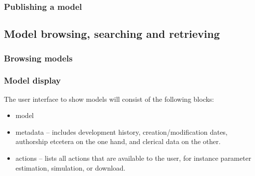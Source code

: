 \subsubsection{Publishing a model}



\subsection{Model browsing, searching and retrieving}

\subsubsection{Browsing models}

\subsubsection{Model display}

The user interface to show models will consist of the following blocks:
\begin{itemize}
\item model
\item metadata -- includes development history, creation/modification dates, authorship etcetera on the one hand, and clerical data on the other.
\item actions -- lists all actions that are available to the user, for instance parameter estimation, simulation, or download.
\end{itemize}

